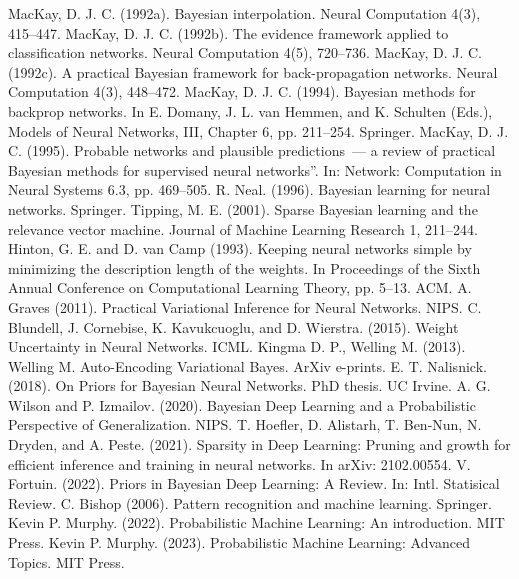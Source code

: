 \documentclass{article}
\numberwithin{equation}{section}
\begin{document}
\begin{thebibliography}{0}
        MacKay, D. J. C. (1992a).
        Bayesian interpolation. Neural Computation 4(3), 415–447.
        MacKay, D. J. C. (1992b).
        The evidence framework applied to classification networks.
        Neural Computation 4(5), 720–736.
        MacKay, D. J. C. (1992c).
        A practical Bayesian framework for back-propagation networks.
        Neural Computation 4(3), 448–472.
        MacKay, D. J. C. (1994).
        Bayesian methods for backprop networks.
        In E. Domany, J. L. van Hemmen, and K. Schulten (Eds.),
        Models of Neural Networks, III, Chapter 6, pp. 211–254.
        Springer.
        MacKay, D. J. C. (1995).
        Probable networks and plausible predictions~---
        a review of practical Bayesian methods for supervised neural networks”.
        In: Network: Computation in Neural Systems 6.3, pp. 469–505.
        R. Neal. (1996).
        Bayesian learning for neural networks.
        Springer.
        Tipping, M. E. (2001).
        Sparse Bayesian learning and the relevance vector machine.
        Journal of Machine Learning Research 1, 211–244.
        Hinton, G. E. and D. van Camp (1993).
        Keeping neural networks simple by minimizing the description length of the weights.
        In Proceedings of the Sixth Annual Conference on Computational Learning Theory, pp. 5–13. ACM.
        A. Graves (2011).
        Practical Variational Inference for Neural Networks.
        NIPS.
        C. Blundell, J. Cornebise, K. Kavukcuoglu, and D. Wierstra. (2015).
        Weight Uncertainty in Neural Networks.
        ICML.
        Kingma D. P., Welling M. (2013).
        Welling M. Auto-Encoding Variational Bayes. ArXiv e-prints.
        E. T. Nalisnick. (2018).
        On Priors for Bayesian Neural Networks.
        PhD thesis. UC Irvine.
        A. G. Wilson and P. Izmailov. (2020).
        Bayesian Deep Learning and a Probabilistic Perspective of Generalization.
        NIPS.
        T. Hoefler, D. Alistarh, T. Ben-Nun, N. Dryden, and A. Peste. (2021).
        Sparsity in Deep Learning:
        Pruning and growth for efficient inference and training in neural networks.
        In arXiv: 2102.00554.
        V. Fortuin. (2022).
        Priors in Bayesian Deep Learning: A Review.
        In: Intl. Statisical Review.
        C. Bishop (2006).
        Pattern recognition and machine learning.
        Springer.
        Kevin P. Murphy. (2022).
        Probabilistic Machine Learning: An introduction.
        MIT Press.
        Kevin P. Murphy. (2023).
        Probabilistic Machine Learning: Advanced Topics.
        MIT Press.
\end{thebibliography}
\end{document}
